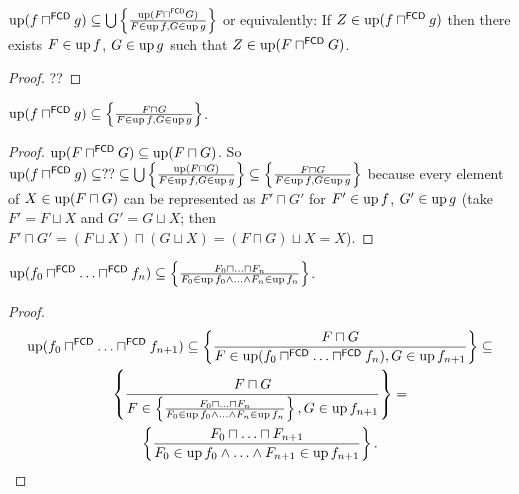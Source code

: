\begin{lem}
$\operatorname{up} (f \sqcap^{\mathsf{FCD}} g) \subseteq \bigcup \left\{ \frac{
\operatorname{up} (F \sqcap^{\mathsf{FCD}} G) }{ F \in \operatorname{up} f, G \in \operatorname{up} g }\right\}$
or equivalently: If $Z\in\operatorname{up} (f \sqcap^{\mathsf{FCD}} g)$ then there exists
$F \in \operatorname{up} f$, $G \in \operatorname{up} g$ such that $Z\in\operatorname{up} (F \sqcap^{\mathsf{FCD}} G)$.
\end{lem}

\begin{proof}
??
\end{proof}

\begin{prop}
$\operatorname{up} (f \sqcap^{\mathsf{FCD}} g) \subseteq \left\{ \frac{ F \sqcap G }{ F \in \operatorname{up} f, G \in \operatorname{up} g }\right\}$.
\end{prop}

\begin{proof}
$\operatorname{up} (F \sqcap^{\mathsf{FCD}} G) \subseteq \operatorname{up} (F
\sqcap G)$. So $\operatorname{up} (f \sqcap^{\mathsf{FCD}} g) \subseteq ?? \subseteq \bigcup
\left\{ \frac{ \operatorname{up} (F \sqcap G) }{ F \in \operatorname{up} f,
G \in \operatorname{up} g }\right\} \subseteq \left\{ \frac{ F \sqcap G }{ F \in \operatorname{up} f, G \in \operatorname{up} g }\right\}$ because every
element of $X \in \operatorname{up} (F \sqcap G)$ can be represented as $F' \sqcap G'$
for $F' \in \operatorname{up} f$, $G' \in \operatorname{up} g$ (take $F' = F \sqcup X$ and $G'
= G \sqcup X$; then $F' \sqcap G' = (F \sqcup X) \sqcap (G \sqcup X) = (F
\sqcap G) \sqcup X = X$).
\end{proof}

\begin{cor}
$\operatorname{up} (f_0 \sqcap^{\mathsf{FCD}} \ldots
\sqcap^{\mathsf{FCD}} f_n) \subseteq \left\{ \frac{ F_0 \sqcap \ldots \sqcap
F_n }{ F_0 \in \operatorname{up} f_0 \wedge \ldots \wedge F_n \in \operatorname{up} f_n }\right\}$.
\end{cor}

\begin{proof}
~
\begin{multline*}
\operatorname{up} (f_0 \sqcap^{\mathsf{FCD}} \ldots
\sqcap^{\mathsf{FCD}} f_{n + 1}) \subseteq \left\{ \frac{ F \sqcap G
}{ F \in \operatorname{up} (f_0 \sqcap^{\mathsf{FCD}}
\ldots \sqcap^{\mathsf{FCD}} f_n), G \in \operatorname{up} f_{n + 1} }\right\} \subseteq \\
\left\{ \frac{ F \sqcap G }{ F \in \left\{ \frac{ F_0
\sqcap \ldots \sqcap F_n }{ F_0 \in \operatorname{up} f_0
\wedge \ldots \wedge F_n \in \operatorname{up} f_n }\right\}, G \in \operatorname{up} f_{n + 1} }\right\} = \\
\left\{ \frac{ F_0 \sqcap \ldots \sqcap F_{n + 1} }{
F_0 \in \operatorname{up} f_0 \wedge \ldots \wedge F_{n + 1} \in
\operatorname{up} f_{n + 1} }\right\}.
\end{multline*}
\end{proof}

